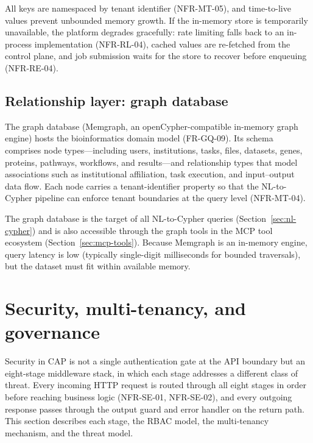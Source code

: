 \documentclass[a4paper,noexaminfo]{sapthesis}
\begin{document}
All keys are namespaced by tenant identifier (NFR-MT-05), and
time-to-live values prevent unbounded memory growth.  If the in-memory
store is temporarily unavailable, the platform degrades gracefully:
rate limiting falls back to an in-process implementation (NFR-RL-04),
cached values are re-fetched from the control plane, and job submission
waits for the store to recover before enqueuing (NFR-RE-04).

\subsection{Relationship layer: graph database}

The graph database (Memgraph, an openCypher-compatible in-memory graph
engine) hosts the bioinformatics domain model (FR-GQ-09).  Its schema
comprises node types---including users, institutions, tasks,
files, datasets, genes, proteins, pathways, workflows, and
results---and relationship types that model associations such as
institutional affiliation, task execution, and input--output data flow.  Each node
carries a tenant-identifier property so that the NL-to-Cypher pipeline can
enforce tenant boundaries at the query level (NFR-MT-04).

The graph database is the target of all NL-to-Cypher queries
(Section~\ref{sec:nl-cypher}) and is also accessible through the graph
tools in the MCP tool ecosystem (Section~\ref{sec:mcp-tools}).  Because
Memgraph is an in-memory engine, query latency is low (typically
single-digit milliseconds for bounded traversals), but the dataset must
fit within available memory.


\section{Security, multi-tenancy, and governance}
\label{sec:security}

Security in CAP is not a single authentication gate at the API boundary
but an eight-stage middleware stack, in which each stage addresses a
different class of threat.  Every incoming HTTP request is routed through
all eight stages in order before reaching business logic (NFR-SE-01,
NFR-SE-02), and every outgoing response passes through the output guard
and error handler on the return path.  This section describes each stage, the RBAC model, the
multi-tenancy mechanism, and the threat model.
\end{document}
